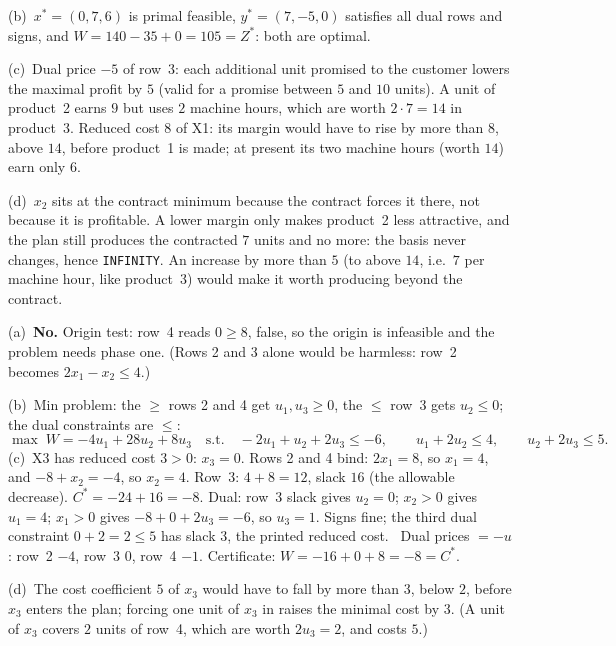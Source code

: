 \begin{solutions}
        (b)~$x^{*}=(0,7,6)$ is primal feasible, $y^{*}=(7,-5,0)$ satisfies
        all dual rows and signs, and $W=140-35+0=105=Z^{*}$: both are
        optimal.

        (c)~Dual price $-5$ of row~3: each additional unit promised to the
        customer lowers the maximal profit by $5$ (valid for a promise
        between $5$ and $10$ units). A unit of product~2 earns $9$ but uses
        $2$ machine hours, which are worth $2\cdot7=14$ in product~3.
        Reduced cost $8$ of X1: its margin would have to rise by more than
        $8$, above $14$, before product~1 is made; at present its two
        machine hours (worth $14$) earn only $6$.

        (d)~$x_{2}$ sits at the contract minimum because the contract
        forces it there, not because it is profitable. A lower margin only
        makes product~2 less attractive, and the plan still produces the
        contracted $7$ units and no more: the basis never changes, hence
        \texttt{INFINITY}. An increase by more than $5$ (to above $14$,
        i.e.\ $7$ per machine hour, like product~3) would make it worth
        producing beyond the contract.

  \item (a)~\textbf{No.} Origin test: row~4 reads $0\ge 8$, false, so the
        origin is infeasible and the problem needs phase one. (Rows 2 and
        3 alone would be harmless: row~2 becomes $2x_{1}-x_{2}\le 4$.)

        (b)~Min problem: the $\ge$ rows 2 and 4 get $u_{1},u_{3}\ge 0$, the
        $\le$ row~3 gets $u_{2}\le 0$; the dual constraints are $\le$:
        \[
          \max\; W=-4u_{1}+28u_{2}+8u_{3}
          \quad\text{s.t.}\quad
          -2u_{1}+u_{2}+2u_{3}\le -6,\qquad u_{1}+2u_{2}\le 4,\qquad
          u_{2}+2u_{3}\le 5 .
        \]
        (c)~X3 has reduced cost $3>0$: $x_{3}=0$. Rows 2 and 4 bind:
        $2x_{1}=8$, so $x_{1}=4$, and $-8+x_{2}=-4$, so $x_{2}=4$. Row~3:
        $4+8=12$, slack $16$ (the allowable decrease). $C^{*}=-24+16=-8$.
        Dual: row~3 slack gives $u_{2}=0$; $x_{2}>0$ gives $u_{1}=4$;
        $x_{1}>0$ gives $-8+0+2u_{3}=-6$, so $u_{3}=1$. Signs fine; the
        third dual constraint $0+2=2\le 5$ has slack $3$, the printed
        reduced cost. \checkmark\ Dual prices $=-u$: row~2 $-4$, row~3
        $0$, row~4 $-1$. Certificate: $W=-16+0+8=-8=C^{*}$.

        (d)~The cost coefficient $5$ of $x_{3}$ would have to fall by more
        than $3$, below $2$, before $x_{3}$ enters the plan; forcing one
        unit of $x_{3}$ in raises the minimal cost by $3$. (A unit of
        $x_{3}$ covers $2$ units of row~4, which are worth $2u_{3}=2$, and
        costs $5$.)


\end{solutions}
